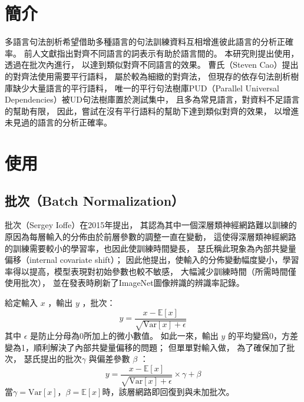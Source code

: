 \section{簡介}
多語言句法剖析希望借助多種語言的句法訓練資料互相增進彼此語言的分析正確率。
前人文獻指出對齊不同語言的詞表示有助於語言間的\zeroshot\cite{cao2020multilingual}。
本研究則提出使用\XNorm，透過在批次內進行，
以達到類似對齊不同語言的效果。
曹氏（Steven Cao）提出的對齊法\cite{cao2020multilingual}使用需要平行語料，
屬於較為細緻的對齊法，
但現存的依存句法剖析樹庫缺少大量語言的平行語料，
唯一的平行句法樹庫PUD（Parallel Universal Dependencies）被UD句法樹庫置於測試集中，
且多為常見語言，對資料不足語言的幫助有限，
因此，嘗試在沒有平行語料的幫助下達到類似對齊的效果，
以增進未見過的語言的分析正確率。

\section{使用}
\subsection{批次\XNorm（Batch Normalization）}
批次（Sergey Ioffe）在2015年提出\cite{pmlr-v37-ioffe15}，
其認為其中一個深層類神經網路難以訓練的原因為每層輸入的分佈由於前層參數的調整一直在變動，
這使得深層類神經網路的訓練需要較小的學習率，也因此使訓練時間變長，
瑟氏稱此現象為內部共變量偏移（internal covariate shift）；
因此他提出，使輸入的分佈變動幅度變小，學習率得以提高，模型表現對初始參數也較不敏感，
大幅減少訓練時間（所需時間僅使用批次），
並在發表時刷新了ImageNet圖像辨識\cite{Deng2009ImageNetAL}的辨識率記錄。

給定輸入 $x$ ，輸出 $y$ ，批次：
\begin{equation}
    y = \frac{x - \mathbb{E}[x]}{\sqrt{\textrm{Var}[x] + \epsilon}}
\end{equation}
其中 $\epsilon$ 是防止分母為0所加上的微小數值。
如此一來，輸出 $y$ 的平均變爲0，方差變為1，順利解決了內部共變量偏移的問題；
但單單對輸入做，
為了確保加了批次，
瑟氏提出的批次 $\gamma$ 與偏差參數 $\beta$ ：
\begin{equation}
    y = \frac{x - \mathbb{E}[x]}{\sqrt{\textrm{Var}[x] + \epsilon}} \times \gamma + \beta
\end{equation}
當$\gamma = \textrm{Var}[x]$，$\beta = \mathbb{E}[x]$時，該層網路即回復到與未加批次。
